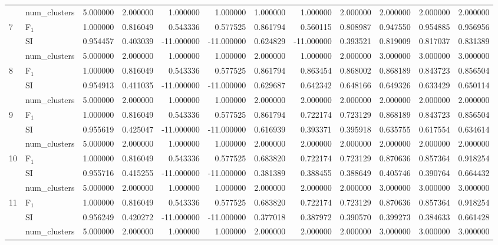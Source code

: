 \begin{tabular}{llrrrrrrrrrr}
 & num_clusters & 5.000000 & 2.000000 & 1.000000 & 1.000000 & 1.000000 & 1.000000 & 2.000000 & 2.000000 & 2.000000 & 2.000000 \\
\multirow[c]{3}{*}{7} & F$_1$ & 1.000000 & 0.816049 & 0.543336 & 0.577525 & 0.861794 & 0.560115 & 0.808987 & 0.947550 & 0.954885 & 0.956956 \\
 & SI & 0.954457 & 0.403039 & -11.000000 & -11.000000 & 0.624829 & -11.000000 & 0.393521 & 0.819009 & 0.817037 & 0.831389 \\
 & num_clusters & 5.000000 & 2.000000 & 1.000000 & 1.000000 & 2.000000 & 1.000000 & 2.000000 & 3.000000 & 3.000000 & 3.000000 \\
\multirow[c]{3}{*}{8} & F$_1$ & 1.000000 & 0.816049 & 0.543336 & 0.577525 & 0.861794 & 0.863454 & 0.868002 & 0.868189 & 0.843723 & 0.856504 \\
 & SI & 0.954913 & 0.411035 & -11.000000 & -11.000000 & 0.629687 & 0.642342 & 0.648166 & 0.649326 & 0.633429 & 0.650114 \\
 & num_clusters & 5.000000 & 2.000000 & 1.000000 & 1.000000 & 2.000000 & 2.000000 & 2.000000 & 2.000000 & 2.000000 & 2.000000 \\
\multirow[c]{3}{*}{9} & F$_1$ & 1.000000 & 0.816049 & 0.543336 & 0.577525 & 0.861794 & 0.722174 & 0.723129 & 0.868189 & 0.843723 & 0.856504 \\
 & SI & 0.955619 & 0.425047 & -11.000000 & -11.000000 & 0.616939 & 0.393371 & 0.395918 & 0.635755 & 0.617554 & 0.634614 \\
 & num_clusters & 5.000000 & 2.000000 & 1.000000 & 1.000000 & 2.000000 & 2.000000 & 2.000000 & 2.000000 & 2.000000 & 2.000000 \\
\multirow[c]{3}{*}{10} & F$_1$ & 1.000000 & 0.816049 & 0.543336 & 0.577525 & 0.683820 & 0.722174 & 0.723129 & 0.870636 & 0.857364 & 0.918254 \\
 & SI & 0.955716 & 0.415255 & -11.000000 & -11.000000 & 0.381389 & 0.388455 & 0.388649 & 0.405746 & 0.390764 & 0.664432 \\
 & num_clusters & 5.000000 & 2.000000 & 1.000000 & 1.000000 & 2.000000 & 2.000000 & 2.000000 & 3.000000 & 3.000000 & 3.000000 \\
\multirow[c]{3}{*}{11} & F$_1$ & 1.000000 & 0.816049 & 0.543336 & 0.577525 & 0.683820 & 0.722174 & 0.723129 & 0.870636 & 0.857364 & 0.918254 \\
 & SI & 0.956249 & 0.420272 & -11.000000 & -11.000000 & 0.377018 & 0.387972 & 0.390570 & 0.399273 & 0.384633 & 0.661428 \\
 & num_clusters & 5.000000 & 2.000000 & 1.000000 & 1.000000 & 2.000000 & 2.000000 & 2.000000 & 3.000000 & 3.000000 & 3.000000 \\
\bottomrule
\end{tabular}
